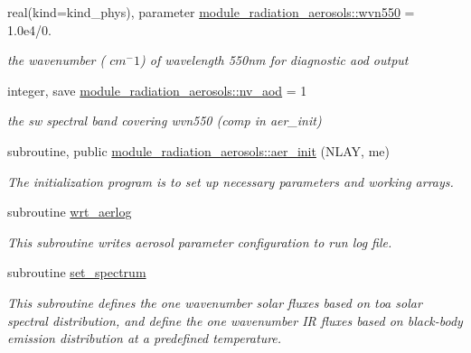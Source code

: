 \begin{DoxyCompactItemize}
\mbox{\label{group__module__radiation__aerosols_ga4555a127ac5bab48353628ea81c55e4e}} 
real(kind=kind\+\_\+phys), parameter \hyperlink{group__module__radiation__aerosols_ga4555a127ac5bab48353628ea81c55e4e}{module\+\_\+radiation\+\_\+aerosols\+::wvn550} = 1.\+0e4/0.
\begin{DoxyCompactList}\small\item\em the wavenumber ( $cm^-1$) of wavelength 550nm for diagnostic aod output \end{DoxyCompactList}\item 
\mbox{\label{group__module__radiation__aerosols_ga112670c954eb372efc017253b1096b17}} 
integer, save \hyperlink{group__module__radiation__aerosols_ga112670c954eb372efc017253b1096b17}{module\+\_\+radiation\+\_\+aerosols\+::nv\+\_\+aod} = 1
\begin{DoxyCompactList}\small\item\em the sw spectral band covering wvn550 (comp in aer\+\_\+init) \end{DoxyCompactList}\item 
subroutine, public \hyperlink{group__module__radiation__aerosols_ga58ac70a5189ef62c63cf2c87465a030a}{module\+\_\+radiation\+\_\+aerosols\+::aer\+\_\+init} (N\+L\+AY, me)
\begin{DoxyCompactList}\small\item\em The initialization program is to set up necessary parameters and working arrays. \end{DoxyCompactList}\item 
\mbox{\label{group__module__radiation__aerosols_ga3135fdf318002f9d56dd2d93225f4aac}} 
subroutine \hyperlink{group__module__radiation__aerosols_ga3135fdf318002f9d56dd2d93225f4aac}{wrt\+\_\+aerlog}
\begin{DoxyCompactList}\small\item\em This subroutine writes aerosol parameter configuration to run log file. \end{DoxyCompactList}\item 
subroutine \hyperlink{group__module__radiation__aerosols_gaa7fe6dc2964bc474a132b93aaab82cb0}{set\+\_\+spectrum}
\begin{DoxyCompactList}\small\item\em This subroutine defines the one wavenumber solar fluxes based on toa solar spectral distribution, and define the one wavenumber IR fluxes based on black-\/body emission distribution at a predefined temperature. \end{DoxyCompactList}\item 

\end{DoxyCompactItemize}

